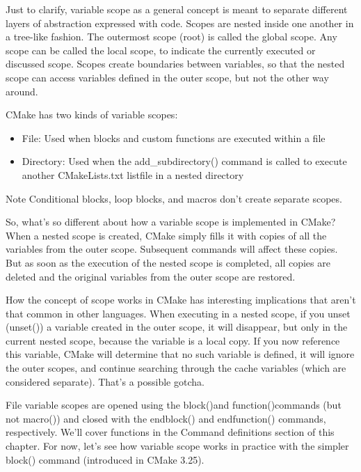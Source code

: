 Just to clarify, variable scope as a general concept is meant to separate different layers of abstraction expressed with code. Scopes are nested inside one another in a tree-like fashion. The outermost scope (root) is called the global scope. Any scope can be called the local scope, to indicate the currently executed or discussed scope. Scopes create boundaries between variables, so that the nested scope can access variables defined in the outer scope, but not the other way around.

CMake has two kinds of variable scopes:

\begin{itemize}
\item
File: Used when blocks and custom functions are executed within a file

\item
Directory: Used when the add\_subdirectory() command is called to execute another CMakeLists.txt listfile in a nested directory
\end{itemize}

\begin{myNotic}{Note}
Conditional blocks, loop blocks, and macros don’t create separate scopes.
\end{myNotic}

So, what’s so different about how a variable scope is implemented in CMake? When a nested scope is created, CMake simply fills it with copies of all the variables from the outer scope. Subsequent commands will affect these copies. But as soon as the execution of the nested scope is completed, all copies are deleted and the original variables from the outer scope are restored.

How the concept of scope works in CMake has interesting implications that aren’t that common in other languages. When executing in a nested scope, if you unset (unset()) a variable created in the outer scope, it will disappear, but only in the current nested scope, because the variable is a local copy. If you now reference this variable, CMake will determine that no such variable is defined, it will ignore the outer scopes, and continue searching through the cache variables (which are considered separate). That’s a possible gotcha.

File variable scopes are opened using the block()and function()commands (but not macro()) and closed with the endblock() and endfunction() commands, respectively. We’ll cover functions in the Command definitions section of this chapter. For now, let’s see how variable scope works in practice with the simpler block() command (introduced in CMake 3.25).

